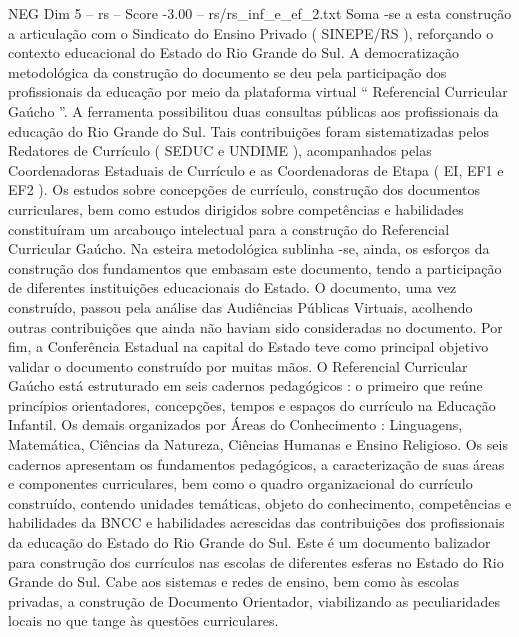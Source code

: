 \begin{textsample}{NEG Dim 5 – rs – Score -3.00 – rs/rs\_inf\_e\_ef\_2.txt}
Soma -se a esta construção a articulação com o Sindicato do Ensino Privado ( SINEPE/RS ), reforçando o contexto educacional do Estado do Rio Grande do Sul.
A democratização metodológica da construção do documento se deu pela participação dos profissionais da educação por meio da plataforma virtual “ Referencial Curricular Gaúcho ”.
A ferramenta possibilitou duas consultas públicas aos profissionais da educação do Rio Grande do Sul.
Tais contribuições foram sistematizadas pelos Redatores de Currículo ( SEDUC e UNDIME ), acompanhados pelas Coordenadoras Estaduais de Currículo e as Coordenadoras de Etapa ( EI, EF1 e EF2 ).
Os estudos sobre concepções de currículo, construção dos documentos curriculares, bem como estudos dirigidos sobre competências e habilidades constituíram um arcabouço intelectual para a construção do Referencial Curricular Gaúcho.
Na esteira metodológica sublinha -se, ainda, os esforços da construção dos fundamentos que embasam este documento, tendo a participação de diferentes instituições educacionais do Estado.
O documento, uma vez construído, passou pela análise das Audiências Públicas Virtuais, acolhendo outras contribuições que ainda não haviam sido consideradas no documento.
Por fim, a Conferência Estadual na capital do Estado teve como principal objetivo validar o documento construído por muitas mãos.
O Referencial Curricular Gaúcho está estruturado em seis cadernos pedagógicos : o primeiro que reúne princípios orientadores, concepções, tempos e espaços do currículo na Educação Infantil.
Os demais organizados por Áreas do Conhecimento : Linguagens, Matemática, Ciências da Natureza, Ciências Humanas e Ensino Religioso.
Os seis cadernos apresentam os fundamentos pedagógicos, a caracterização de suas áreas e componentes curriculares, bem como o quadro organizacional do currículo construído, contendo unidades temáticas, objeto do conhecimento, competências e habilidades da BNCC e habilidades acrescidas das contribuições dos profissionais da educação do Estado do Rio Grande do Sul.
Este é um documento balizador para construção dos currículos nas escolas de diferentes esferas no Estado do Rio Grande do Sul.
Cabe aos sistemas e redes de ensino, bem como às escolas privadas, a construção de Documento Orientador, viabilizando as peculiaridades locais no que tange às questões curriculares.

\end{textsample}
